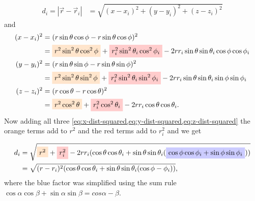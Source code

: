 \begin{align}
    d_i = \left|\vec{r} - \vec{r}_i \right| &= \sqrt{(x-x_i)^2 + (y-y_i)^2 + (z-z_i)^2}
\end{align}
and
\begin{align}
    (x-x_i)^2 &= (r\sin{\theta}\cos{\phi} - r\sin{\theta}\cos{\phi})^2 \nonumber \\
    &= \tikz[baseline]{
        \node[fill=orange!20,anchor=base]
        {\(r^2\sin^2{\theta}\cos^2{\phi}\)}
    } + \tikz[baseline]{
        \node[fill=red!20,anchor=base]
        {\(r_i^2\sin^2{\theta_i}\cos^2{\phi_i}\)}
    } - 2r r_i \sin{\theta}\sin{\theta_i}\cos{\phi}\cos{\phi_i} \label{eq:x-dist-squared} \\
    (y-y_i)^2 &= (r\sin{\theta}\sin{\phi} - r\sin{\theta}\sin{\phi})^2 \nonumber \\
    &= \tikz[baseline]{
        \node[fill=orange!20,anchor=base]
        {\(r^2\sin^2{\theta}\sin^2{\phi}\)}
    } + \tikz[baseline]{
        \node[fill=red!20,anchor=base]
        {\(r_i^2\sin^2{\theta_i}\sin^2{\phi_i}\)}
    } - 2r r_i \sin{\theta}\sin{\theta_i}\sin{\phi}\sin{\phi_i} \label{eq:y-dist-squared} \\
    (z-z_i)^2 &= (r\cos{\theta} - r\cos{\theta})^2 \nonumber \\
    &= \tikz[baseline]{
        \node[fill=orange!20,anchor=base]
        {\(r^2\cos^2{\theta}\)}
    } + \tikz[baseline]{
        \node[fill=red!20,anchor=base]
        {\(r_i^2\cos^2{\theta_i}\)}
    } - 2r r_i \cos{\theta}\cos{\theta_i}. \label{eq:z-dist-squared}
\end{align}
Now adding all three \cref{eq:x-dist-squared,eq:y-dist-squared,eq:z-dist-squared} the orange terms add to \(r^2\) and the red terms add to \(r_i^2\) and we get

\begin{align}
    d_i &= \sqrt{
        \tikz[baseline]{\node[fill=orange!20,anchor=base]{\(r^2\)}}
        + \tikz[baseline]{\node[fill=red!20,anchor=base]{\(r_i^2\)}}
        -2r r_i(\cos{\theta}\cos{\theta_i}+\sin{\theta}\sin{\theta_i}(
            \tikz[baseline]{\node[fill=blue!20,anchor=base]{
                \(\cos{\phi}\cos{\phi_i} + \sin{\phi}\sin{\phi_i}\)}}
        ))
    } \\
    &= \sqrt{(r - r_i)^2(\cos{\theta}\cos{\theta_i}+\sin{\theta}\sin{\theta_i}(\cos{\phi - \phi_i}))},
\end{align}
where the blue factor was simplified using the sum rule \\
\(\cos{\alpha}\cos{\beta} + \sin{\alpha}\sin{\beta} = cos{\alpha-\beta}\)\cite{WeissteinTrig}.

